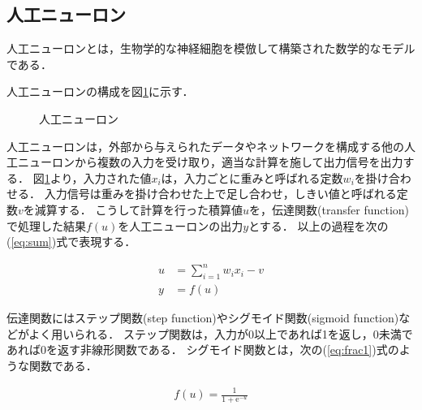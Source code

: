 \documentclass[a4j,12pt,dvipdfmx]{jreport}
\begin{document}
\subsection{人工ニューロン}
人工ニューロンとは，生物学的な神経細胞を模倣して構築された数学的なモデルである\cite{ms_tamura}．

人工ニューロンの構成を図\ref{fig:neuron}に示す．

\begin{figure}[b]
  \centering
  \caption{人工ニューロン}
  \label{fig:neuron}
\end{figure}

人工ニューロンは，外部から与えられたデータやネットワークを構成する他の人工ニューロンから複数の入力を受け取り，適当な計算を施して出力信号を出力する．
図\ref{fig:neuron}より，入力された値$x_i$は，入力ごとに重みと呼ばれる定数$w_i$を掛け合わせる．
入力信号は重みを掛け合わせた上で足し合わせ，しきい値と呼ばれる定数$v$を減算する．
こうして計算を行った積算値$u$を，伝達関数(transfer function)で処理した結果$f(u)$を人工ニューロンの出力$y$とする．
以上の過程を次の(\ref{eq:sum})式で表現する．

\begin{equation}
  \label{eq:sum}
  \begin{split}
    u &= \sum_{i=1}^n w_ix_i - v \\
    y &= f(u)
  \end{split}
\end{equation}

伝達関数にはステップ関数(step function)やシグモイド関数(sigmoid function)などがよく用いられる\cite{ANN}\cite{G}．
ステップ関数は，入力が0以上であれば1を返し，0未満であれば0を返す非線形関数である．
シグモイド関数とは，次の(\ref{eq:frac1})式のような関数である．

\begin{eqnarray}
  \label{eq:frac1}
  f(u) = \frac{1}{1 + \mathrm{e}^{-u}}
\end{eqnarray}
\end{document}
